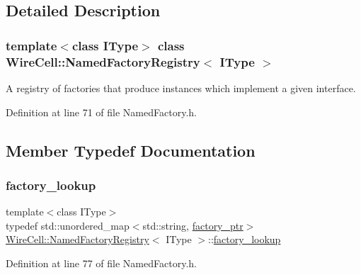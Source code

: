 \subsection{Detailed Description}
\subsubsection*{template$<$class I\+Type$>$\newline
class Wire\+Cell\+::\+Named\+Factory\+Registry$<$ I\+Type $>$}

A registry of factories that produce instances which implement a given interface. 

Definition at line 71 of file Named\+Factory.\+h.



\subsection{Member Typedef Documentation}
\mbox{\label{class_wire_cell_1_1_named_factory_registry_af53a5c841e67e2e1245849939e5f611e}} 
\subsubsection{\texorpdfstring{factory\+\_\+lookup}{factory\_lookup}}
{\footnotesize\ttfamily template$<$class I\+Type$>$ \\
typedef std\+::unordered\+\_\+map$<$std\+::string, \hyperlink{class_wire_cell_1_1_named_factory_registry_a4d693bf86f7a8a24ac7dc00d92d929cf}{factory\+\_\+ptr}$>$ \hyperlink{class_wire_cell_1_1_named_factory_registry}{Wire\+Cell\+::\+Named\+Factory\+Registry}$<$ I\+Type $>$\+::\hyperlink{class_wire_cell_1_1_named_factory_registry_af53a5c841e67e2e1245849939e5f611e}{factory\+\_\+lookup}}



Definition at line 77 of file Named\+Factory.\+h.

\mbox{\label{class_wire_cell_1_1_named_factory_registry_a4d693bf86f7a8a24ac7dc00d92d929cf}} 
